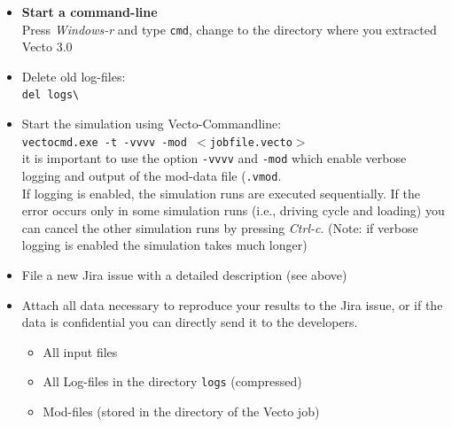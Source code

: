 \begin{itemize}
	\item \textbf{Start a command-line}\\
		Press \textit{Windows-r} and type \texttt{cmd}, change to the directory where you extracted Vecto 3.0
	\item Delete old log-files:\\
		\texttt{del logs\textbackslash*}
	\item Start the simulation using Vecto-Commandline: \\
		\texttt{vectocmd.exe -t -vvvv -mod $<$jobfile.vecto$>$} \\
		it is important to use  the option \texttt{-vvvv} and \texttt{-mod} which enable verbose logging and output of the mod-data file (\texttt{.vmod}. \\[0.5em]
		If logging is enabled, the simulation runs are executed sequentially. If the error occurs only in some simulation runs (i.e., driving cycle and loading) you can cancel the other simulation runs by pressing \textit{Ctrl-c}. (Note: if verbose logging is enabled the simulation takes much longer)
	\item File a new Jira issue with a detailed description (see above)
	\item Attach all data necessary to reproduce your results to the Jira issue, or if the data is confidential you can directly send it to the developers.
	\begin{itemize}
		\item All input files
		\item All Log-files in the directory \texttt{logs} (compressed)
		\item Mod-files (stored in the directory of the Vecto job)
	\end{itemize}
\end{itemize}




